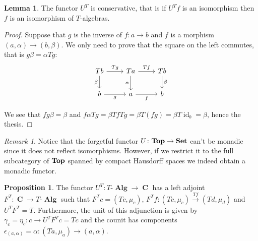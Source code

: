 \documentclass[a4paper,11pt,fullpage,oneside,openany]{amsbook}
\newcommand{\catname}[1]{{\normalfont\textbf{#1}}}
\DeclareMathOperator{\Alg}{\mathbf{Alg}}
\newcommand{\Set}{\catname{Set}}
\newcommand{\Top}{\catname{Top}}
\DeclareMathOperator{\C}{\mathbf{C}}
\DeclareMathOperator{\id}{id}
\theoremstyle{definition}
\theoremstyle{definition}
\newtheorem{prop}[thm]{Proposition}
\newtheorem{lemma}[thm]{Lemma}
\theoremstyle{remark}
\newtheorem{rmk}[thm]{Remark}
\begin{document}
	\begin{lemma}
		The functor $U^T$ is conservative, that is if $U^Tf$ is an isomorphism then $f$ is an isomorphism of $T$-algebras.
	\end{lemma}
	\begin{proof}
		Suppose that $g$ is the inverse of $f\colon a\rightarrow b$ and $f$ is a morphism $(a,\alpha)\rightarrow (b,\beta)$. We only need to prove that the square on the left commutes, that is $g\beta=\alpha Tg$:
		\[
			\begin{tikzcd}
				Tb\arrow["\beta"']{d}\arrow["Tg"]{r}
				& Ta\arrow["\alpha"']{d}\arrow["Tf"]{r}
				& Tb\arrow["\beta"]{d} \\
				b\arrow["g"']{r}
				& a\arrow["f"']{r}
				& b
			\end{tikzcd}
		\]
		
	We see that $fg\beta=\beta$ and $f\alpha Tg=\beta Tf Tg=\beta T(fg)=\beta T\id_b=\beta$, hence the thesis.
	\end{proof}
    \begin{rmk}
     Notice that the forgetful functor $U\colon\Top\to\Set$ can't be monadic since it does not reflect isomorphisms. However, if we restrict it to the full subcategory of $\Top$ spanned by compact Hausdorff spaces we indeed obtain a monadic functor.
    \end{rmk}
	\begin{prop}
		The functor $U^T\colon T\mbox{-}\Alg\rightarrow\C$ has a left adjoint $F^T\colon\C\rightarrow T\mbox{-}\Alg$ such that $F^Tc=(Tc,\mu_{c})$, $F^Tf\colon(Tc,\mu_{c})\xrightarrow{Tf} (Td,\mu_{d})$ and $U^TF^T=T$. Furthermore, the unit of this adjunction is given by $\gamma_c=\eta_c\colon c\to U^TF^Tc=Tc$ and the counit has components $\epsilon_{(a,\alpha)}=\alpha\colon(Ta,\mu_a)\to(a,\alpha)$.
	\end{prop}
\end{document}
